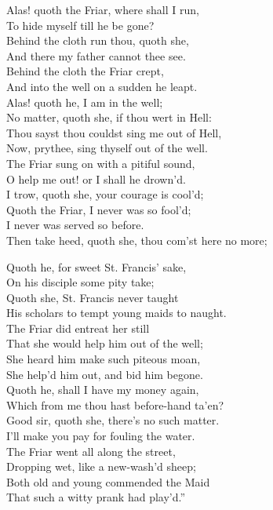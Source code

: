 \begin{dcverse}Alas! quoth the Friar, where shall I run,\\
To hide myself till he be gone?\\
Behind the cloth run thou, quoth she,\\
And there my father cannot thee see.\\
Behind the cloth the Friar crept,\\
And into the well on a sudden he leapt.\\
Alas! quoth he, I am in the well;\\
No matter, quoth she, if thou wert in Hell:\\
Thou sayst thou couldst sing me out of Hell,\\
Now, prythee, sing thyself out of the well.\\
The Friar sung on with a pitiful sound,\\
O help me out! or I shall he drown'd.\\
I trow, quoth she, your courage is cool’d;\\
Quoth the Friar, I never was so fool’d;\\
I never was served so before.\\
Then take heed, quoth she, thou com’st here no more;

Quoth he, for sweet St. Francis’ sake,\\
On his disciple some pity take;\\
Quoth she, St. Francis never taught\\
His scholars to tempt young maids to naught.\\
The Friar did entreat her still\\
That she would help him out of the well;\\
She heard him make such piteous moan,\\
She help’d him out, and bid him begone.\\
Quoth he, shall I have my money again,\\
Which from me thou hast before-hand ta’en?\\
Good sir, quoth she, there’s no such matter.\\
I’ll make you pay for fouling the water.\\
The Friar went all along the street,\\
Dropping wet, like a new-wash'd sheep;\\
Both old and young commended the Maid\\
That such a witty prank had play’d.”
\end{dcverse}

